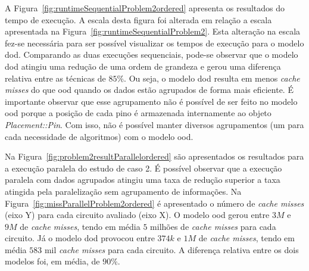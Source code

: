 

A Figura~\ref{fig:runtimeSequentialProblem2ordered} apresenta os resultados do tempo de execução. A escala desta figura foi alterada em relação a escala apresentada na Figura~\ref{fig:runtimeSequentialProblem2}. Esta alteração na escala fez-se necessária para ser possível visualizar os tempos de execução para o modelo \ac{dod}.
Comparando as duas execuções sequenciais, pode-se observar que o modelo \ac{dod} atingiu uma redução de uma ordem de grandeza e gerou uma diferença relativa entre as técnicas de $85\%$. 
Ou seja, o modelo \ac{dod} resulta em menos \textit{cache misses} do que \ac{ood} quando os dados estão agrupados de forma mais eficiente.
É importante observar que esse agrupamento não é possível de ser feito no modelo \ac{ood} porque a posição de cada pino é armazenada internamente ao objeto \textit{Placement::Pin}.
Com isso, não é possível manter diversos agrupamentos (um para cada necessidade de algoritmos) com o modelo \ac{ood}.


Na Figura~\ref{fig:problem2resultParallelordered} são apresentados os resultados para a execução paralela do estudo de caso 2.
É possível observar que a execução paralela com dados agrupados atingiu uma taxa de redução superior a taxa atingida pela paralelização sem agrupamento de informações.
Na Figura~\ref{fig:missParallelProblem2ordered} é apresentado o número de  \textit{cache misses} (eixo Y) para cada circuito avaliado (eixo X).
O modelo \ac{ood} gerou entre $3M$ e $9M$ de \textit{cache misses}, tendo em média $5$ milhões de  \textit{cache misses} para cada circuito.
Já o modelo \ac{dod} provocou entre $374k$ e $1M$ de \textit{cache misses}, tendo em média $583$ mil  \textit{cache misses} para cada circuito. 
A diferença relativa entre os dois modelos foi, em média, de $90\%$.

